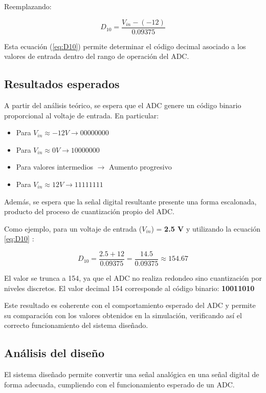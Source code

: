 \documentclass[12pt, a4paper]{article}
\begin{document}
    Reemplazando:

    $$ D_{10} = \frac{V_{in} - (-12)}{0.09375} $$

    Esta ecuación (\ref{eq:D10}) permite determinar el código decimal asociado a los valores de entrada dentro del rango de operación del ADC.

    \subsection{Resultados esperados}

   A partir del análisis teórico, se espera que el ADC genere un código binario proporcional al voltaje de entrada. En particular:

    \begin{itemize}
        \item Para $V_{in} \approx -12V \rightarrow 00000000$
        \item Para $V_{in} \approx 0V \rightarrow 10000000$
        \item Para valores intermedios $\rightarrow$ Aumento progresivo
        \item Para $V_{in} \approx 12V \rightarrow 11111111$
    \end{itemize}

    Además, se espera que la señal digital resultante presente una forma escalonada, producto del proceso de cuantización propio del ADC.

    \newpage

    Como ejemplo, para un voltaje de entrada ($V_{in}$) = \textbf{2.5 V} y utilizando la ecuación \ref{eq:D10} :

    $$ D_{10} = \frac{2.5 + 12}{0.09375} = \frac{14.5}{0.09375} \approx 154.67 $$

    El valor se trunca a 154, ya que el ADC no realiza redondeo sino cuantización por niveles discretos.
    El valor decimal 154 corresponde al código binario: \textbf{10011010}

    Este resultado es coherente con el comportamiento esperado del ADC y permite su comparación con los valores obtenidos en la simulación, verificando así el correcto funcionamiento del sistema diseñado.



    \subsection{Análisis del diseño}

    El sistema diseñado permite convertir una señal analógica en una señal digital de forma adecuada, cumpliendo con el funcionamiento esperado de un ADC.
\end{document}
